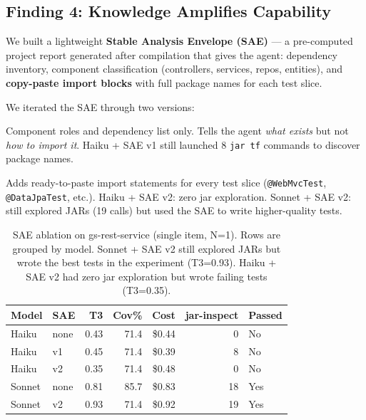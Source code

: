 \documentclass[11pt,a4paper]{article}
\begin{document}
\subsection{Finding 4: Knowledge Amplifies Capability}

We built a lightweight \textbf{Stable Analysis Envelope (SAE)} --- a pre-computed
project report generated after compilation that gives the agent: dependency inventory,
component classification (controllers, services, repos, entities), and
\textbf{copy-paste import blocks} with full package names for each test slice.

We iterated the SAE through two versions:

\begin{description}[style=nextline, leftmargin=2em]
  \item[SAE v1 (short annotations)]
    Component roles and dependency list only. Tells the agent \emph{what exists}
    but not \emph{how to import it}. Haiku + SAE v1 still launched 8
    \texttt{jar tf} commands to discover package names.
  \item[SAE v2 (full import blocks)]
    Adds ready-to-paste import statements for every test slice
    (\texttt{@WebMvcTest}, \texttt{@DataJpaTest}, etc.).
    Haiku + SAE v2: zero jar exploration. Sonnet + SAE v2: still explored
    JARs (19 calls) but used the SAE to write higher-quality tests.
\end{description}

\begin{table}[H]
\centering
\small
\begin{tabular}{@{}llrrrrl@{}}
\toprule
\textbf{Model} & \textbf{SAE} & \textbf{T3} & \textbf{Cov\%} & \textbf{Cost} & \textbf{jar-inspect} & \textbf{Passed} \\
\midrule
Haiku   & none    & 0.43 & 71.4 & \$0.44 & 0  & No \\
Haiku   & v1      & 0.45 & 71.4 & \$0.39 & 8  & No \\
Haiku   & v2      & 0.35 & 71.4 & \$0.48 & 0  & No \\
\addlinespace
Sonnet  & none    & 0.81 & 85.7 & \$0.83 & 18 & Yes \\
Sonnet  & v2      & 0.93 & 71.4 & \$0.92 & 19 & Yes \\
\bottomrule
\end{tabular}
\caption{SAE ablation on gs-rest-service (single item, N=1).
Rows are grouped by model. Sonnet + SAE v2 still explored JARs but wrote
the best tests in the experiment (T3=0.93). Haiku + SAE v2 had zero jar
exploration but wrote failing tests (T3=0.35).}
\end{table}
\end{document}
